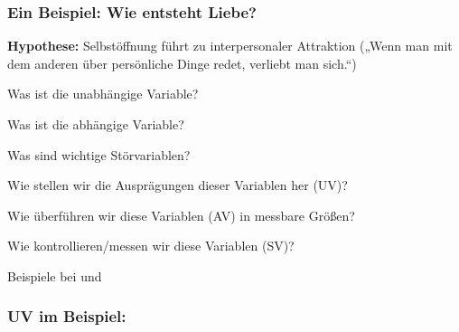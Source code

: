 \documentclass[
]{book}
\begin{document}
\hypertarget{ein-beispiel-wie-entsteht-liebe}{%
\subsubsection{Ein Beispiel: Wie entsteht Liebe?}\label{ein-beispiel-wie-entsteht-liebe}}

\textbf{Hypothese:} Selbstöffnung führt zu interpersonaler Attraktion
(„Wenn man mit dem anderen über persönliche Dinge redet, verliebt man sich.``)

Was ist die unabhängige Variable?

Was ist die abhängige Variable?

Was sind wichtige Störvariablen?

Wie stellen wir die Ausprägungen dieser Variablen her (UV)?

Wie überführen wir diese Variablen (AV) in messbare Größen?

Wie kontrollieren/messen wir diese Variablen (SV)?

Beispiele bei \citet{aronExperimentalGenerationInterpersonal1997} und \citet{sprecherEffectsSelfdisclosureRole2013}

\hypertarget{uv-im-beispiel}{%
\subsubsection{UV im Beispiel:}\label{uv-im-beispiel}}
\end{document}
